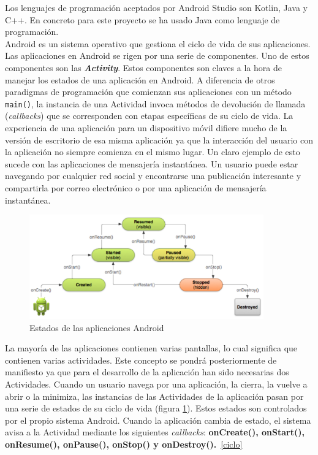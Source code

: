 Los lenguajes de programaci\'on aceptados por Android Studio son Kotlin, Java y C++. En concreto para este proyecto se ha usado Java como lenguaje de programaci\'on.\\

Android es un sistema operativo que gestiona el ciclo de vida de sus aplicaciones. Las aplicaciones en Android se rigen por una serie de componentes. Uno de estos componentes son las \textbf{\textit{Activity}}. Estos componentes son claves a la hora de manejar los estados de una aplicaci\'on en Android. A diferencia de otros paradigmas de programaci\'on que comienzan sus aplicaciones con un m\'etodo \texttt{main()}, la instancia de una Actividad invoca m\'etodos de devoluci\'on de llamada (\emph{callbacks}) que se corresponden con etapas espec\'ificas de su ciclo de vida. La experiencia de una aplicaci\'on para un dispositivo m\'ovil difiere mucho de la versi\'on de escritorio de esa misma aplicaci\'on ya que la interacci\'on del usuario con la aplicaci\'on no siempre comienza en el mismo lugar. Un claro ejemplo de esto sucede con las aplicaciones de mensajer\'ia instant\'anea. Un usuario puede estar navegando por cualquier red social y encontrarse una publicaci\'on interesante y compartirla por correo electr\'onico o por una aplicaci\'on de mensajer\'ia instant\'anea.

\begin{figure}[!h]
    \centering
    \includegraphics[width=0.90\textwidth]{./Imagenes/Vectorial/lifecycle-states.pdf}
    \caption{Estados de las aplicaciones Android}
\label{Fig:estados}
\end{figure}

La mayor\'ia de las aplicaciones contienen varias pantallas, lo cual significa que contienen varias actividades. Este concepto se pondr\'a posteriormente de manifiesto ya que para el desarrollo de la aplicaci\'on han sido necesarias dos Actividades.
Cuando un usuario navega por una aplicaci\'on, la cierra, la vuelve a abrir o la minimiza, las instancias de las Actividades de la aplicaci\'on pasan por una serie de estados de su ciclo de vida (figura \ref{Fig:estados}). Estos estados son controlados por el propio sistema Android. Cuando la aplicaci\'on cambia de estado, el sistema avisa a la Actividad mediante los siguientes \emph{callbacks}: \textbf{onCreate(), onStart(), onResume(), onPause(), onStop() y onDestroy().}~\ref{ciclo}

